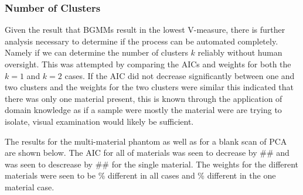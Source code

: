 \documentclass[a4paper,11pt]{article}
\begin{document}
\subsubsection{Number of Clusters}

Given the result that BGMMs result in the lowest V-measure, there is further analysis necessary to determine if the process can be automated completely. Namely if we can determine the number of clusters $k$ reliably without human oversight. This was attempted by comparing the AICs and weights for both the $k=1$ and $k=2$ cases. If the AIC did not decrease significantly between one and two clusters and the weights for the two clusters were similar this indicated that there was only one material present, this is known through the application of domain knowledge as if a sample were mostly the material were are trying to isolate, visual examination would likely be sufficient. 

The results for the multi-material phantom as well as for a blank scan of PCA are shown below. The AIC for all of materials was seen to decrease by \#\# and was seen to descrease by \#\# for the single material. The weights for the different materials were seen to be \% different in all cases and \% different in the one material case.
\end{document}

